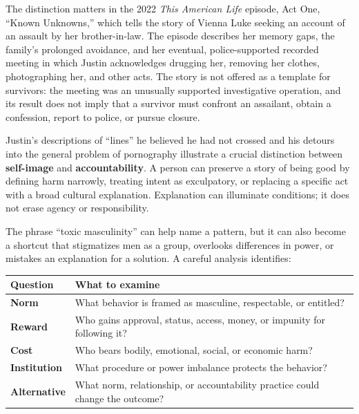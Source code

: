 \documentclass[
  11pt,
  letterpaper,
]{article}
\newcounter{none} %
\begin{document}
The distinction matters in the 2022 \emph{This American Life} episode,
Act One, ``Known Unknowns,'' which tells the story of Vienna Luke
seeking an account of an assault by her brother-in-law. The episode
describes her memory gaps, the family's prolonged avoidance, and her
eventual, police-supported recorded meeting in which Justin acknowledges
drugging her, removing her clothes, photographing her, and other acts.
The story is not offered as a template for survivors: the meeting was an
unusually supported investigative operation, and its result does not
imply that a survivor must confront an assailant, obtain a confession,
report to police, or pursue closure.

Justin's descriptions of ``lines'' he believed he had not crossed and
his detours into the general problem of pornography illustrate a crucial
distinction between \textbf{self-image} and \textbf{accountability}. A
person can preserve a story of being good by defining harm narrowly,
treating intent as exculpatory, or replacing a specific act with a broad
cultural explanation. Explanation can illuminate conditions; it does not
erase agency or responsibility.

The phrase ``toxic masculinity'' can help name a pattern, but it can
also become a shortcut that stigmatizes men as a group, overlooks
differences in power, or mistakes an explanation for a solution. A
careful analysis identifies:

{\def\LTcaptype{none} %
\begin{longtable}[]{@{}
  >{\raggedright\arraybackslash}p{}
  >{\raggedright\arraybackslash}p{}@{}}
\toprule\noalign{}
\begin{minipage}[b]{\linewidth}\raggedright
Question
\end{minipage} & \begin{minipage}[b]{\linewidth}\raggedright
What to examine
\end{minipage} \\
\midrule\noalign{}
\endhead
\bottomrule\noalign{}
\endlastfoot
\textbf{Norm} & What behavior is framed as masculine, respectable, or
entitled? \\
\textbf{Reward} & Who gains approval, status, access, money, or impunity
for following it? \\
\textbf{Cost} & Who bears bodily, emotional, social, or economic
harm? \\
\textbf{Institution} & What procedure or power imbalance protects the
behavior? \\
\textbf{Alternative} & What norm, relationship, or accountability
practice could change the outcome? \\
\end{longtable}
}
\end{document}
